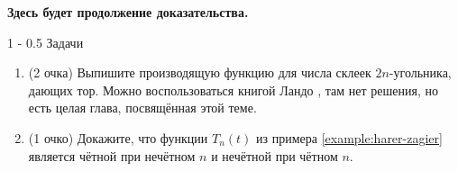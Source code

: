\documentclass{article}
\makeatletter
\theoremstyle{definition}
\renewcommand{\section}{\@startsection
{section}%
{1}%
{\z@}%
{-\baselineskip}%
{0.5\baselineskip}%
{\centering\large\scshape}} %
\makeatother
\begin{document}
\textbf{Здесь будет продолжение доказательства.}

\section{Задачи}

\begin{enumerate}
    \item(2 очка) Выпишите производящую функцию для числа склеек \( 2n \)-угольника,
дающих тор. Можно воспользоваться книгой Ландо \cite{lando}, там нет решения, но
есть целая глава, посвящённая этой теме.
    \item(1 очко) Докажите, что функции \( T_n(t) \) из примера
\ref{example:harer-zagier}
является чётной при нечётном \( n \) и нечётной при чётном \( n \).
\end{enumerate}

\footnotesize


    
\end{document}
